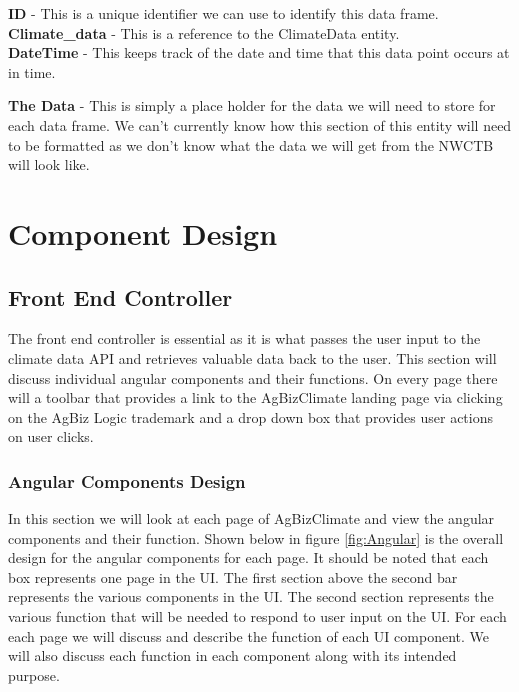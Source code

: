 \documentclass[onecolumn, draftclsnofoot,10pt, compsoc]{article}
\begin{document}
					\textbf{ID} - This is a unique identifier we can use to identify this data frame.\\

					\textbf{Climate\_data} - This is a reference to the ClimateData entity.\\

					\textbf{DateTime} - This keeps track of the date and time that this data point occurs at in time.

					\textbf{The Data} - This is simply a place holder for the data we will need to store for each data frame. We can't currently know how this section of this entity will need to be formatted as we don't know what the data we will get from the NWCTB will look like.\\





\section{Component Design}

	\subsection{Front End Controller}
		The front end controller is essential as it is what passes the user input to the climate data API and retrieves valuable data back to the user. This section will discuss individual angular components and their functions. On every page there will a toolbar that provides a link to the AgBizClimate landing page via clicking on the AgBiz Logic trademark and a drop down box that provides user actions on user clicks.\\
		\subsubsection{Angular Components Design}
		In this section we will look at each page of AgBizClimate and view the angular components and their function. Shown below in figure \ref{fig:Angular} is the overall design for the angular components for each page. It should be noted that each box represents one page in the UI. The first section above the second bar represents the various components in the UI. The second section represents the various function that will be needed to respond to user input on the UI. For each each page we will discuss and describe the function of each UI component. We will also discuss each function in each component along with its intended purpose.\\
		
\end{document}
